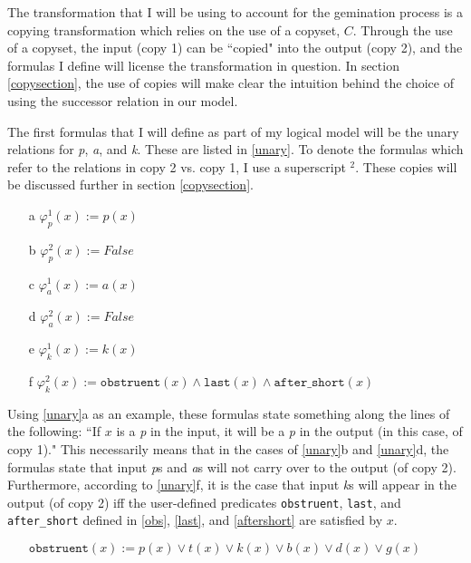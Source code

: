\documentclass{article}
\begin{document}
The transformation that I will be using to account for the gemination process is a copying transformation which relies on the use of a copyset, $C$. Through the use of a copyset, the input (copy 1) can be “copied" into the output (copy 2), and the formulas I define will license the transformation in question. In section \ref{copysection}, the use of copies will make clear the intuition behind the choice of using the successor relation in our model.

The first formulas that I will define as part of my logical model will be the unary relations for \textit{p}, \textit{a}, and \textit{k}. These are listed in \ref{unary}. To denote the formulas which refer to the relations in copy 2 vs. copy 1, I use a superscript $^2$. These copies will be discussed further in section \ref{copysection}.

\begin{exe}
    \ex
    \label{unary}
    \begin{itemize}
        \item [a] $\varphi_{p}^1(x) := p(x)$
        \item [b] $\varphi_{p}^2(x) := False$
        \item [c] $\varphi_{a}^1(x) := a(x)$
        \item [d] $\varphi_{a}^2(x) := False$
        \item [e] $\varphi_{k}^1(x) := k(x)$
        \item [f] $\varphi_{k}^2(x) := \texttt{obstruent}(x) \wedge \texttt{last}(x) \wedge \texttt{after\_short}(x)$
    \end{itemize}
\end{exe}

Using \ref{unary}a as an example, these formulas state something along the lines of the following: “If $x$ is a \textit{p} in the input, it will be a \textit{p} in the output (in this case, of copy 1)." This necessarily means that in the cases of \ref{unary}b and \ref{unary}d, the formulas state that input \textit{p}s and \textit{a}s will not carry over to the output (of copy 2). Furthermore, according to \ref{unary}f, it is the case that input \textit{k}s will appear in the output (of copy 2) iff the user-defined predicates \texttt{obstruent}, \texttt{last}, and \texttt{after\_short} defined in \ref{obs}, \ref{last}, and \ref{aftershort} are satisfied by $x$.

\begin{exe}
    \ex
    \label{obs}
    \begin{itemize}
        \item [] $\texttt{obstruent}(x) := p(x) \vee t(x) \vee k(x) \vee b(x) \vee d(x) \vee g(x)$
    \end{itemize}
\end{exe}
\end{document}
